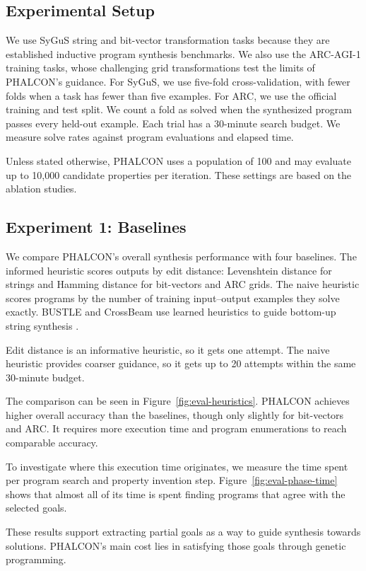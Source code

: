 \documentclass[letterpaper]{article} %
\begin{document}
\subsection{Experimental Setup}
We use SyGuS string and bit-vector transformation tasks because they
are established inductive program synthesis benchmarks. We also use
the ARC-AGI-1 training tasks, whose challenging grid transformations
test the limits of PHALCON's guidance.
For SyGuS, we use five-fold cross-validation, with fewer folds when a
task has fewer than five examples. For ARC, we use the official training
and test split. We count a fold as solved when the synthesized program
passes every held-out example. Each trial has a 30-minute search budget.
We measure solve rates against program evaluations and elapsed
time.

Unless stated otherwise, PHALCON uses a population of 100 and may
evaluate up to 10,000 candidate properties per iteration. These settings
are based on the ablation studies.

\subsection{Experiment 1: Baselines}
We compare PHALCON's overall synthesis performance with four baselines.
The informed heuristic scores outputs by edit distance: Levenshtein
distance for strings and Hamming distance for bit-vectors and ARC grids.
The naive heuristic scores programs by the number of training
input--output examples they solve exactly. BUSTLE and CrossBeam use
learned heuristics to guide bottom-up string synthesis
\citep{odena2021bustle,shi2022crossbeam}.

Edit distance is an informative heuristic, so it gets one attempt. The naive heuristic provides
coarser guidance, so it gets up to 20 attempts within the same
30-minute budget.


The comparison can be seen in Figure~\ref{fig:eval-heuristics}.
PHALCON achieves higher overall accuracy than the baselines, though
only slightly for bit-vectors and ARC. It requires more execution time
and program enumerations to reach comparable accuracy.

To investigate where this execution time originates, we measure the
time spent per program search and property invention step.
Figure~\ref{fig:eval-phase-time} shows that almost all of its time is
spent finding programs that agree with the selected goals.

These results support extracting partial goals as a way to guide
synthesis towards solutions. PHALCON's main cost lies in satisfying
those goals through genetic programming.
\end{document}
